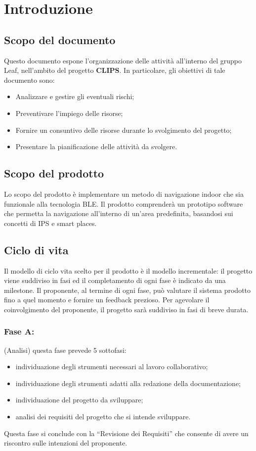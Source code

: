 \documentclass[../introduzione.tex]{subfiles}
\begin{document}
\section{Introduzione}
	\subsection{Scopo del documento}
	Questo documento espone l'organizzazione delle attività all'interno del gruppo Leaf, nell'ambito del progetto \textbf{CLIPS}.
In particolare, gli obiettivi di tale documento sono:
	\begin{itemize}
	\item Analizzare e gestire gli eventuali rischi;
	\item Preventivare l'impiego delle risorse;
	\item Fornire un consuntivo delle risorse durante lo svolgimento del progetto;
	\item Presentare la pianificazione delle attività da svolgere.
	\end{itemize}
	
	\subsection{Scopo del prodotto}
	Lo scopo del prodotto è implementare un metodo di navigazione indoor che sia funzionale alla tecnologia BLE.
	Il prodotto comprenderà un prototipo software che permetta la navigazione all’interno di un’area predefinita, basandosi sui concetti di IPS e smart places.


	\subsection{Ciclo di vita}
	Il modello di ciclo vita scelto per il prodotto è il modello incrementale: il progetto viene suddiviso in fasi ed il completamento di ogni fase è indicato da una milestone.
	Il proponente, al termine di ogni fase, può valutare il sistema prodotto fino a quel momento e fornire un feedback prezioso.
	Per agevolare il coinvolgimento del proponente, il progetto sarà suddiviso in fasi di breve durata.

		\subsubsection{Fase A:}(Analisi) questa fase prevede 5 sottofasi:
		\begin{itemize}
		\item individuazione degli strumenti necessari al lavoro collaborativo;
		\item individuazione degli strumenti adatti alla redazione della documentazione;
		\item individuazione del progetto da sviluppare;
		\item analisi dei requisiti del progetto che si intende sviluppare.
		\end{itemize}
		Questa fase si conclude con la “Revisione dei Requisiti” che consente di avere un riscontro sulle intenzioni del proponente.
\end{document}
